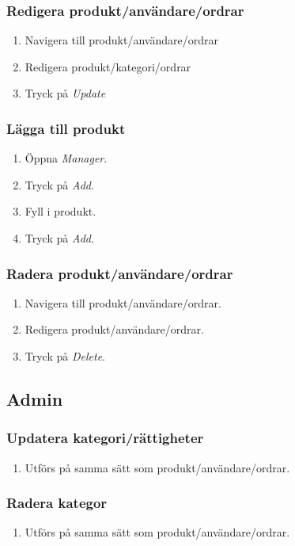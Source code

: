 \documentclass[a4paper]{article}
\begin{document}
\subsubsection{Redigera produkt/användare/ordrar}
\begin{enumerate}
  \item Navigera till produkt/användare/ordrar
  \item Redigera produkt/kategori/ordrar
  \item Tryck på \textit{Update}
\end{enumerate}
%
\subsubsection{Lägga till produkt}
\begin{enumerate}
  \item Öppna \textit{Manager}.
  \item Tryck på \textit{Add}.
  \item Fyll i produkt.
  \item Tryck på \textit{Add}.
\end{enumerate}
%
\subsubsection{Radera produkt/användare/ordrar}
\begin{enumerate}
  \item Navigera till produkt/användare/ordrar.
  \item Redigera produkt/användare/ordrar.
  \item Tryck på \textit{Delete}.
\end{enumerate}
%
\subsection{Admin}
\subsubsection{Updatera kategori/rättigheter}
\begin{enumerate}
  \item Utförs på samma sätt som produkt/användare/ordrar.
\end{enumerate}
%
\subsubsection{Radera kategor}
\begin{enumerate}
  \item Utförs på samma sätt som produkt/användare/ordrar.
\end{enumerate}
%
\end{document}
